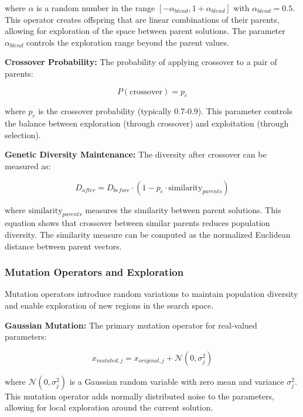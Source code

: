 \documentclass[12pt,a4paper]{article}
\begin{document}
where $\alpha$ is a random number in the range $[-\alpha_{blend}, 1 + \alpha_{blend}]$ with $\alpha_{blend} = 0.5$. This operator creates offspring that are linear combinations of their parents, allowing for exploration of the space between parent solutions. The parameter $\alpha_{blend}$ controls the exploration range beyond the parent values.

\textbf{Crossover Probability:} The probability of applying crossover to a pair of parents:

\begin{equation}\label{Eq.crossover_probability}
P(\text{crossover}) = p_c
\end{equation}

where $p_c$ is the crossover probability (typically 0.7-0.9). This parameter controls the balance between exploration (through crossover) and exploitation (through selection).

\textbf{Genetic Diversity Maintenance:} The diversity after crossover can be measured as:

\begin{equation}\label{Eq.crossover_diversity}
D_{after} = D_{before} \cdot (1 - p_c \cdot \text{similarity}_{parents})
\end{equation}

where $\text{similarity}_{parents}$ measures the similarity between parent solutions. This equation shows that crossover between similar parents reduces population diversity. The similarity measure can be computed as the normalized Euclidean distance between parent vectors.

\subsubsection{Mutation Operators and Exploration}

Mutation operators introduce random variations to maintain population diversity and enable exploration of new regions in the search space.

\textbf{Gaussian Mutation:} The primary mutation operator for real-valued parameters:

\begin{equation}\label{Eq.gaussian_mutation}
x_{mutated,j} = x_{original,j} + \mathcal{N}(0, \sigma_j^2)
\end{equation}

where $\mathcal{N}(0, \sigma_j^2)$ is a Gaussian random variable with zero mean and variance $\sigma_j^2$. This mutation operator adds normally distributed noise to the parameters, allowing for local exploration around the current solution.
\end{document}
